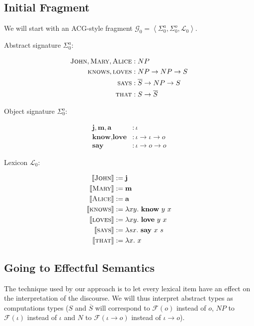 \documentclass{article}
\newcommand{\abs}[1]{\textsc{#1}}
\newcommand{\obj}[1]{\textbf{#1}}
\newcommand{\sem}[1]{\llbracket #1 \rrbracket}
\newcommand{\lex}[2]{\sem{\abs{#1}} &:= #2}
\begin{document}
\subsection{Initial Fragment}

We will start with an ACG-style fragment $\mathcal{G}_0 = \left<
\Sigma^a_0, \Sigma^o_0, \mathcal{L}_0 \right>$.

Abstract signature $\Sigma^a_0$:

\begin{align*}
  \abs{John}, \abs{Mary}, \abs{Alice} &: NP \\
  \abs{knows}, \abs{loves} &: NP \to NP \to S \\
  \abs{says} &: \overline{S} \to NP \to S \\
  \abs{that} &: S \to \overline{S} \\
\end{align*}

Object signature $\Sigma^o_0$:

\begin{align*}
  \obj{j}, \obj{m}, \obj{a} &: \iota \\
  \obj{know}, \obj{love} &: \iota \to \iota \to o \\
  \obj{say} &: \iota \to o \to o
\end{align*}

Lexicon $\mathcal{L}_0$:

\begin{align*}
  \lex{John}{\obj{j}} \\
  \lex{Mary}{\obj{m}} \\
  \lex{Alice}{\obj{a}} \\
  \lex{knows}{\lambda x y.\ \obj{know}\ y\ x} \\
  \lex{loves}{\lambda x y.\ \obj{love}\ y\ x} \\
  \lex{says}{\lambda s x.\ \obj{say}\ x\ s} \\
  \lex{that}{\lambda x.\ x}
\end{align*}


\subsection{Going to Effectful Semantics}

The technique used by our approach is to let every lexical item have an
effect on the interpretation of the discourse. We will thus interpret
abstract types as computations types ($S$ and $\overline{S}$ will
correspond to $\mathcal{F}(o)$ instead of $o$, $NP$ to $\mathcal{F}(\iota)$
instead of $\iota$ and $N$ to $\mathcal{F}(\iota \to o)$ instead of $\iota
\to o$).
\end{document}

